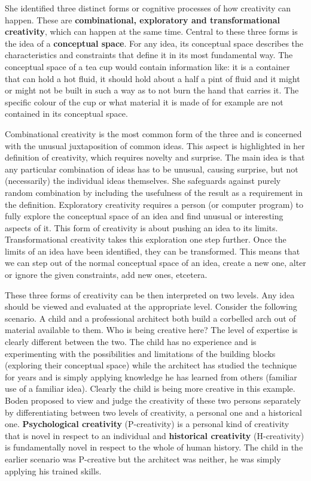 She identified three distinct forms or cognitive processes of how creativity can happen. These are \textbf{combinational, exploratory and transformational creativity}, which can happen at the same time. Central to these three forms is the idea of a \textbf{conceptual space}. For any idea, its conceptual space describes the characteristics and constraints that define it in its most fundamental way. The conceptual space of a tea cup would contain information like: it is a container that can hold a hot fluid, it should hold about a half a pint of fluid and it might or might not be built in such a way as to not burn the hand that carries it. The specific colour of the cup or what material it is made of for example are not contained in its conceptual space.

Combinational creativity is the most common form of the three and is concerned with the unusual juxtaposition of common ideas. This aspect is highlighted in her definition of creativity, which requires novelty and surprise. The main idea is that any particular combination of ideas has to be unusual, causing surprise, but not (necessarily) the individual ideas themselves. She safeguards against purely random combination by including the usefulness of the result as a requirement in the definition. Exploratory creativity requires a person (or computer program) to fully explore the conceptual space of an idea and find unusual or interesting aspects of it. This form of creativity is about pushing an idea to its limits. Transformational creativity takes this exploration one step further. Once the limits of an idea have been identified, they can be transformed. This means that we can step out of the normal conceptual space of an idea, create a new one, alter or ignore the given constraints, add new ones, etcetera.

These three forms of creativity can be then interpreted on two levels. Any idea should be viewed and evaluated at the appropriate level. Consider the following scenario. A child and a professional architect both build a corbelled arch out of material available to them. Who is being creative here? The level of expertise is clearly different between the two. The child has no experience and is experimenting with the possibilities and limitations of the building blocks (exploring their conceptual space) while the architect has studied the technique for years and is simply applying knowledge he has learned from others (familiar use of a familiar idea). Clearly the child is being more creative in this example. Boden proposed to view and judge the creativity of these two persons separately by differentiating between two levels of creativity, a personal one and a historical one. \textbf{Psychological creativity} (P-creativity) is a personal kind of creativity that is novel in respect to an individual and \textbf{historical creativity} (H-creativity) is fundamentally novel in respect to the whole of human history. The child in the earlier scenario was P-creative but the architect was neither, he was simply applying his trained skills.


